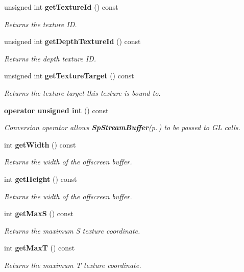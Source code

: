 \begin{CompactItemize}
unsigned int {\bf get\-Texture\-Id} () const
\begin{CompactList}\small\item\em Returns the texture ID. \item\end{CompactList}\item 
unsigned int {\bf get\-Depth\-Texture\-Id} () const
\begin{CompactList}\small\item\em Returns the depth texture ID. \item\end{CompactList}\item 
unsigned int {\bf get\-Texture\-Target} () const
\begin{CompactList}\small\item\em Returns the texture target this texture is bound to. \item\end{CompactList}\item 
{\bf operator unsigned int} () const
\begin{CompactList}\small\item\em Conversion operator allows {\bf Sp\-Stream\-Buffer}{\rm (p.\,\pageref{classSpark_1_1SpStreamBuffer})} to be passed to GL calls. \item\end{CompactList}\item 
int {\bf get\-Width} () const
\begin{CompactList}\small\item\em Returns the width of the offscreen buffer. \item\end{CompactList}\item 
int {\bf get\-Height} () const
\begin{CompactList}\small\item\em Returns the width of the offscreen buffer. \item\end{CompactList}\item 
int {\bf get\-Max\-S} () const
\begin{CompactList}\small\item\em Returns the maximum S texture coordinate. \item\end{CompactList}\item 
int {\bf get\-Max\-T} () const
\begin{CompactList}\small\item\em Returns the maximum T texture coordinate. \item\end{CompactList}\item 

\end{CompactItemize}
